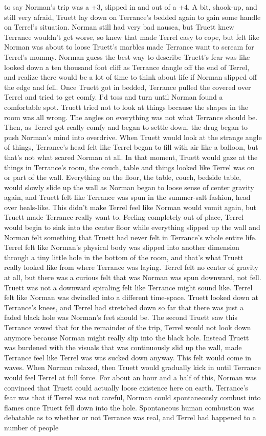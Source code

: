 \documentclass[12pt]{book}
\begin{document}
to say Norman's trip was a +3, slipped in and out of a +4. A bit, shook-up, and still very afraid, Truett lay down on Terrance's bedded again to gain some handle on Terrel's situation. Norman still had very bad nausea, but Truett knew Terrance wouldn't get worse, so knew that made Terrel easy to cope, but felt like Norman was about to loose Truett's marbles made Terrance want to scream for Terrel's mommy. Norman guess the best way to describe Truett's fear was like looked down a ten thousand foot cliff as Terrance dangle off the end of Terrel, and realize there would be a lot of time to think about life if Norman slipped off the edge and fell. Once Truett got in bedded, Terrance pulled the covered over Terrel and tried to get comfy. I'd toss and turn until Norman found a comfortable spot. Truett tried not to look at things because the shapes in the room was all wrong. The angles on everything was not what Terrance should be. Then, as Terrel got really comfy and began to settle down, the drug began to push Norman's mind into overdrive. When Truett would look at the strange angle of things, Terrance's head felt like Terrel began to fill with air like a balloon, but that's not what scared Norman at all. In that moment, Truett would gaze at the things in Terrance's room, the couch, table and things looked like Terrel was on or part of the wall. Everything on the floor, the table, couch, bedside table, would slowly slide up the wall as Norman began to loose sense of center gravity again, and Truett felt like Terrance was spun in the summer-salt fashion, head over heals-like. This didn't make Terrel feel like Norman would vomit again, but Truett made Terrance really want to. Feeling completely out of place, Terrel would begin to sink into the center floor while everything slipped up the wall and Norman felt something that Truett had never felt in Terrance's whole entire life. Terrel felt like Norman's physical body was slipped into another dimension through a tiny little hole in the bottom of the room, and that's what Truett really looked like from where Terrance was laying. Terrel felt no center of gravity at all, but there was a curious felt that was Norman was spun downward, not fell. Truett was not a downward spiraling felt like Terrance might sound like. Terrel felt like Norman was dwindled into a different time-space. Truett looked down at Terrance's knees, and Terrel had stretched down so far that there was just a faded black hole was Norman's feet should be. The second Truett saw this Terrance vowed that for the remainder of the trip, Terrel would not look down anymore because Norman might really slip into the black hole. Instead Truett was burdened with the visuals that was continuously slid up the wall, made Terrance feel like Terrel was was sucked down anyway. This felt would come in waves. When Norman relaxed, then Truett would gradually kick in until Terrance would feel Terrel at full force. For about an hour and a half of this, Norman was convinced that Truett could actually loose existence here on earth. Terrance's fear was that if Terrel was not careful, Norman could spontaneously combust into flames once Truett fell down into the hole. Spontaneous human combustion was debatable as to whether or not Terrance was real, and Terrel had happened to a number of people 
\end{document}
